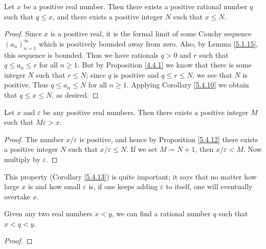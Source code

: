 \begin{proposition}\label{5.4.12}
Let \(x\) be a positive real number.
Then there exists a positive rational number \(q\) such that \(q \leq x\), and there exists a positive integer \(N\) such that \(x \leq N\).
\end{proposition}

\begin{proof}
Since \(x\) is a positive real, it is the formal limit of some Cauchy sequence \((a_n)_{n = 1}^{\infty}\) which is positively bounded away from zero.
Also, by Lemma \ref{5.1.15}, this sequence is bounded.
Thus we have rationals \(q > 0\) and \(r\) such that \(q \leq a_n \leq r\) for all \(n \geq 1\).
But by Proposition \ref{4.4.1} we know that there is some integer \(N\) such that \(r \leq N\);
since \(q\) is positive and \(q \leq r \leq N\), we see that \(N\) is positive.
Thus \(q \leq a_n \leq N\) for all \(n \geq 1\).
Applying Corollary \ref{5.4.10} we obtain that \(q \leq x \leq N\), as desired.
\end{proof}

\begin{corollary}\label{5.4.13}
Let \(x\) and \(\varepsilon\) be any positive real numbers.
Then there exists a positive integer \(M\) such that \(M\varepsilon > x\).
\end{corollary}

\begin{proof}
The number \(x / \varepsilon\) is positive, and hence by Proposition \ref{5.4.12} there exists a positive integer \(N\) such that \(x / \varepsilon \leq N\).
If we set \(M \coloneqq N + 1\), then \(x / \varepsilon < M\).
Now multiply by \(\varepsilon\).
\end{proof}

\begin{note}
This property (Corollary \ref{5.4.13}) is quite important;
it says that no matter how large \(x\) is and how small \(\varepsilon\) is, if one keeps adding \(\varepsilon\) to itself, one will eventually overtake \(x\).
\end{note}

\begin{proposition}\label{5.4.14}
Given any two real numbers \(x < y\), we can find a rational number \(q\) such that \(x < q < y\).
\end{proposition}

\begin{proof}

\end{proof}

